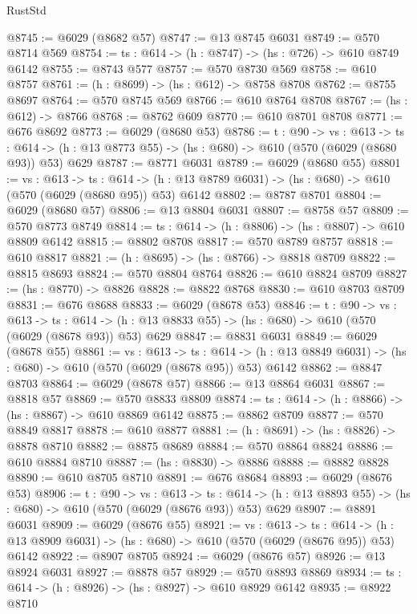 \begin{lexlean}{RustStd}
\begin{coremodule}
@8745 := @6029 (@8682 @57)
@8747 := @13 @8745 @6031
@8749 := @570 @8714 @569
@8754 := {ts : @614} -> (h : @8747) -> (hs : @726) -> @610 @8749 @6142
@8755 := @8743 @577
@8757 := @570 @8730 @569
@8758 := @610 @8757
@8761 := (h : @8699) -> (hs : @612) -> @8758 @8708
@8762 := @8755 @8697
@8764 := @570 @8745 @569
@8766 := @610 @8764 @8708
@8767 := (hs : @612) -> @8766
@8768 := @8762 @609
@8770 := @610 @8701 @8708
@8771 := @676 @8692
@8773 := @6029 (@8680 @53)
@8786 := {t : @90} ->
  {vs : @613} ->
  {ts : @614} -> (h : @13 @8773 @55) -> (hs : @680) -> @610 (@570 (@6029 (@8680 @93)) @53) @629
@8787 := @8771 @6031
@8789 := @6029 (@8680 @55)
@8801 := {vs : @613} ->
  {ts : @614} -> (h : @13 @8789 @6031) -> (hs : @680) -> @610 (@570 (@6029 (@8680 @95)) @53) @6142
@8802 := @8787 @8701
@8804 := @6029 (@8680 @57)
@8806 := @13 @8804 @6031
@8807 := @8758 @57
@8809 := @570 @8773 @8749
@8814 := {ts : @614} -> (h : @8806) -> (hs : @8807) -> @610 @8809 @6142
@8815 := @8802 @8708
@8817 := @570 @8789 @8757
@8818 := @610 @8817
@8821 := (h : @8695) -> (hs : @8766) -> @8818 @8709
@8822 := @8815 @8693
@8824 := @570 @8804 @8764
@8826 := @610 @8824 @8709
@8827 := (hs : @8770) -> @8826
@8828 := @8822 @8768
@8830 := @610 @8703 @8709
@8831 := @676 @8688
@8833 := @6029 (@8678 @53)
@8846 := {t : @90} ->
  {vs : @613} ->
  {ts : @614} -> (h : @13 @8833 @55) -> (hs : @680) -> @610 (@570 (@6029 (@8678 @93)) @53) @629
@8847 := @8831 @6031
@8849 := @6029 (@8678 @55)
@8861 := {vs : @613} ->
  {ts : @614} -> (h : @13 @8849 @6031) -> (hs : @680) -> @610 (@570 (@6029 (@8678 @95)) @53) @6142
@8862 := @8847 @8703
@8864 := @6029 (@8678 @57)
@8866 := @13 @8864 @6031
@8867 := @8818 @57
@8869 := @570 @8833 @8809
@8874 := {ts : @614} -> (h : @8866) -> (hs : @8867) -> @610 @8869 @6142
@8875 := @8862 @8709
@8877 := @570 @8849 @8817
@8878 := @610 @8877
@8881 := (h : @8691) -> (hs : @8826) -> @8878 @8710
@8882 := @8875 @8689
@8884 := @570 @8864 @8824
@8886 := @610 @8884 @8710
@8887 := (hs : @8830) -> @8886
@8888 := @8882 @8828
@8890 := @610 @8705 @8710
@8891 := @676 @8684
@8893 := @6029 (@8676 @53)
@8906 := {t : @90} ->
  {vs : @613} ->
  {ts : @614} -> (h : @13 @8893 @55) -> (hs : @680) -> @610 (@570 (@6029 (@8676 @93)) @53) @629
@8907 := @8891 @6031
@8909 := @6029 (@8676 @55)
@8921 := {vs : @613} ->
  {ts : @614} -> (h : @13 @8909 @6031) -> (hs : @680) -> @610 (@570 (@6029 (@8676 @95)) @53) @6142
@8922 := @8907 @8705
@8924 := @6029 (@8676 @57)
@8926 := @13 @8924 @6031
@8927 := @8878 @57
@8929 := @570 @8893 @8869
@8934 := {ts : @614} -> (h : @8926) -> (hs : @8927) -> @610 @8929 @6142
@8935 := @8922 @8710

\end{coremodule}
\end{lexlean}
